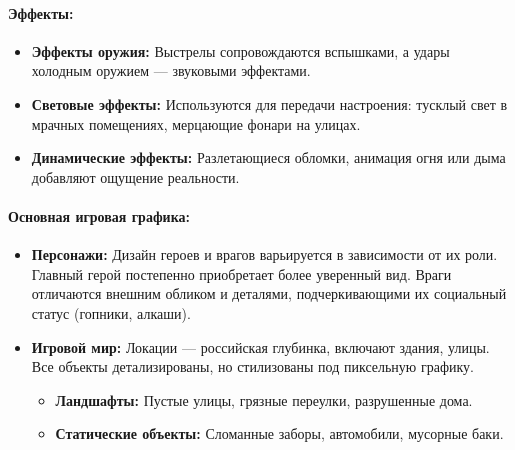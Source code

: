\documentclass[12pt]{article}
\begin{document}
        \paragraph{Эффекты:} 
        \begin{itemize}
            \item \textbf{Эффекты оружия:} Выстрелы сопровождаются вспышками, а удары холодным оружием — звуковыми эффектами.
            \item \textbf{Световые эффекты:} Используются для передачи настроения: тусклый свет в мрачных помещениях, мерцающие фонари на улицах.
            \item \textbf{Динамические эффекты:} Разлетающиеся обломки, анимация огня или дыма добавляют ощущение реальности.
        \end{itemize}
        
        \paragraph{Основная игровая графика:} 
            \begin{itemize}
                \item \textbf{Персонажи:} Дизайн героев и врагов варьируется в зависимости от их роли. Главный герой постепенно приобретает более уверенный вид. Враги отличаются внешним обликом и деталями, подчеркивающими их социальный статус (гопники, алкаши).
                \item \textbf{Игровой мир:} Локации — российская глубинка, включают здания, улицы. Все объекты детализированы, но стилизованы под пиксельную графику.
            \begin{itemize}
                \item \textbf{Ландшафты:} Пустые улицы, грязные переулки, разрушенные дома.
                \item \textbf{Статические объекты:} Сломанные заборы, автомобили, мусорные баки.
            \end{itemize}
            \end{itemize}
\end{document}
